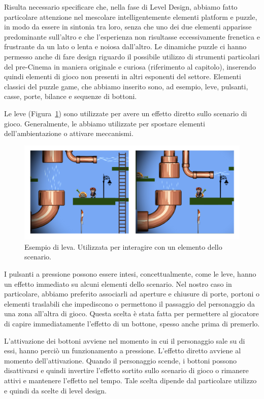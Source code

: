 Risulta necessario specificare che, nella fase di Level Design, abbiamo fatto particolare attenzione nel mescolare intelligentemente elementi platform e puzzle, in modo da essere in sintonia tra loro, senza che uno dei due elementi apparisse predominante sull’altro e che l’esperienza non risultasse eccessivamente frenetica e frustrante da un lato o lenta e noiosa dall’altro.
Le dinamiche puzzle ci hanno permesso anche di fare design riguardo il possibile utilizzo di strumenti particolari del pre-Cinema in maniera originale e curiosa (riferimento al capitolo), inserendo quindi elementi di gioco non presenti in altri esponenti del settore.
Elementi classici del puzzle game, che abbiamo inserito sono, ad esempio, leve, pulsanti, casse, porte, bilance e sequenze di bottoni.

Le leve (Figura~\ref{fig:platform_leve}) sono utilizzate per avere un effetto diretto sullo scenario di gioco. Generalmente, le abbiamo utilizzate per spostare elementi dell’ambientazione o attivare meccanismi.

\begin{figure}%
	\centering
	\includegraphics[width= \columnwidth]{images/gameDesign/09.jpg}
	\caption{Esempio di leva. Utilizzata per interagire con un elemento dello scenario.}
	\label{fig:platform_leve}
\end{figure}

I pulsanti a pressione possono essere intesi, concettualmente, come le leve, hanno un effetto immediato su alcuni elementi dello scenario. Nel nostro caso in particolare, abbiamo preferito associarli ad aperture e chiusure di porte, portoni o elementi traslabili che impediscono o permettono il passaggio del personaggio da una zona all’altra di gioco. Questa scelta è stata fatta per permettere al giocatore di capire immediatamente l’effetto di un bottone, spesso anche prima di premerlo.

L’attivazione dei bottoni avviene nel momento in cui il personaggio sale su di essi, hanno perciò un funzionamento a pressione. L’effetto diretto avviene al momento dell’attivazione. Quando il personaggio scende, i bottoni possono disattivarsi e quindi invertire l’effetto sortito sullo scenario di gioco o rimanere attivi e mantenere l’effetto nel tempo. Tale scelta dipende dal particolare utilizzo e quindi da scelte di level design.

